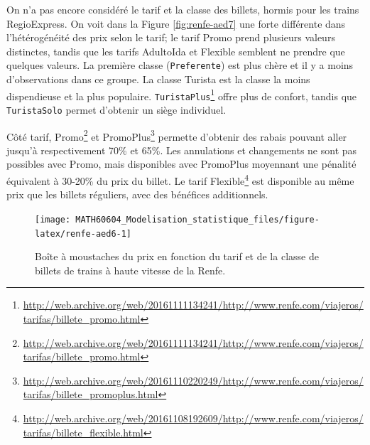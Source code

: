 \documentclass[
  11pt,
  letterpaper,
]{article}
\renewcommand{\href}[2]{#2\footnote{\url{#1}}}
\theoremstyle{definition}
\theoremstyle{definition}
\theoremstyle{definition}
\theoremstyle{definition}
\theoremstyle{remark}
\begin{document}
On n'a pas encore considéré le tarif et la classe des billets, hormis pour les trains RegioExpress. On voit dans la Figure \ref{fig:renfe-aed7} une forte différente dans l'hétérogénéité des prix selon le tarif; le tarif Promo prend plusieurs valeurs distinctes, tandis que les tarifs AdultoIda et Flexible semblent ne prendre que quelques valeurs. La première classe (\texttt{Preferente}) est plus chère et il y a moins d'observations dans ce groupe. La classe Turista est la classe la moins dispendieuse et la plus populaire. \href{http://web.archive.org/web/20161111134241/http://www.renfe.com/viajeros/tarifas/billete_promo.html}{\texttt{TuristaPlus}} offre plus de confort, tandis que \texttt{TuristaSolo} permet d'obtenir un siège individuel.

Côté tarif, \href{http://web.archive.org/web/20161111134241/http://www.renfe.com/viajeros/tarifas/billete_promo.html}{Promo} et \href{http://web.archive.org/web/20161110220249/http://www.renfe.com/viajeros/tarifas/billete_promoplus.html}{PromoPlus} permette d'obtenir des rabais pouvant aller jusqu'à respectivement 70\% et 65\%. Les annulations et changements ne sont pas possibles avec Promo, mais disponibles avec PromoPlus moyennant une pénalité équivalent à 30-20\% du prix du billet. Le tarif \href{http://web.archive.org/web/20161108192609/http://www.renfe.com/viajeros/tarifas/billete_flexible.html}{Flexible} est disponible au même prix que les billets réguliers, avec des bénéfices additionnels.

\begin{figure}

{\centering \texttt{[image: MATH60604\_Modelisation\_statistique\_files/figure-latex/renfe-aed6-1]} 

}

\caption{Boîte à moustaches du prix en fonction du tarif et de la classe de billets de trains à haute vitesse de la Renfe.}\label{fig:renfe-aed6}
\end{figure}
\end{document}
